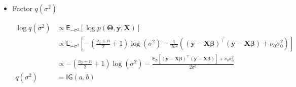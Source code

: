 \begin{appendix}
\begin{itemize}
\begin{equation}
\begin{split}
\log q(\bm{\beta})
&\propto\mathsf{E}_{-\bm{\beta}}\left[\log p(\bm{\Theta},\bm{y}, \bm{X})\right]\\
&\propto\mathsf{E}_{-\bm{\beta}}\left[-\frac{1}{2\sigma^2}  \left((\bm{y} - \bm{X} \bm{\beta})^{\top}
(\bm{y} - \bm{X} \bm{\beta})\right) -\frac{1}{2}(\bm{\beta} - \bm{\beta}_0)^{\top}
\bm{\Sigma}_0^{-1} (\bm{\beta} - \bm{\beta}_0)\right]\\
&\propto \mathsf{E}_{-\bm{\beta}}\left[-\frac{1}{2} \left( \bm{\beta}^\top \left( \frac{1}{\sigma^2} \bm{X}^\top \bm{X} + \bm{\Sigma}_0^{-1} \right) \bm{\beta} - 2 \bm{\beta}^\top \left( \frac{1}{\sigma^2} \bm{X}^\top \bm{y} + \bm{\Sigma}_0^{-1} \bm{\beta}_0 \right) \right) \right] \\
&\propto -\frac{1}{2} \left( \bm{\beta}^\top \left(\mathsf{E}_{\sigma^2}\left[ \frac{1}{\sigma^2} \right]\bm{X}^\top \bm{X} + \bm{\Sigma}_0^{-1} \right) \bm{\beta} - 2 \bm{\beta}^\top \left(\mathsf{E}_{\sigma^2}\left[ \frac{1}{\sigma^2}\right] \bm{X}^\top \bm{y} + \bm{\Sigma}_0^{-1} \bm{\beta}_0 \right) \right)\\
q(\bm{\beta})
&= \mathsf{N_p}\left(\bm{\mu}_{\bm{\beta}},\bm{\Sigma}_{\bm{\beta}}\right)
\end{split}
\end{equation}

where

\begin{equation}
\bm{\mu}_{\bm{\beta}}=\left(\mathsf{E}_{\sigma^2}\left[ \frac{1}{\sigma^2} \right]\bm{X}^\top \bm{X} + \bm{\Sigma}_0^{-1} \right)^{-1}\left(\mathsf{E}_{\sigma^2}\left[ \frac{1}{\sigma^2}\right] \bm{X}^\top \bm{y} + \bm{\Sigma}_0^{-1} \bm{\beta}_0 \right)
\end{equation}

and

\begin{equation}
\bm{\Sigma}_{\bm{\beta}} = \left(\mathsf{E}_{\sigma^2}\left[ \frac{1}{\sigma^2} \right]\bm{X}^\top \bm{X} + \bm{\Sigma}_0^{-1} \right)^{-1}
\end{equation}

\item Factor $q(\sigma^2)$

\begin{equation}
\begin{split}
\log q(\sigma^2)
&\propto\mathsf{E}_{-\sigma^2}\left[\log p(\bm{\Theta},\bm{y}, \bm{X})\right]\\
&\propto\mathsf{E}_{-\sigma^2}\left[-\left( \frac{\nu_0 + n}{2} + 1 \right)\log (\sigma^2) -\frac{1}{2\sigma^2} \left( (\bm{y} - \bm{X} \bm{\beta})^{\top}
(\bm{y} - \bm{X} \bm{\beta})+\nu_0 \sigma_0^2\right)\right]\\
&\propto -\left( \frac{\nu_0 + n}{2} + 1 \right)\log (\sigma^2) - \frac{\mathsf{E}_{\bm{\beta}}\left[(\bm{y} - \bm{X} \bm{\beta})^{\top}
(\bm{y} - \bm{X} \bm{\beta})  \right] + \nu_0 \sigma_0^2 }{2\sigma^2}\\
q(\sigma^2)
&= \mathsf{IG}\left( a, b \right)
\end{split}
\end{equation}


\end{itemize}
\end{appendix}
